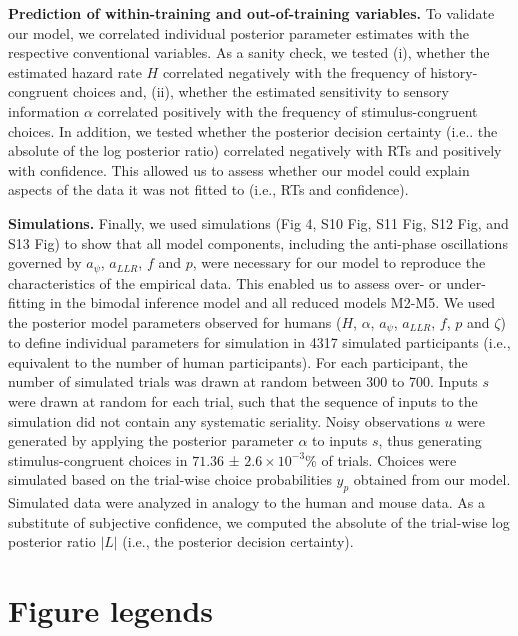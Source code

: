 \documentclass[
]{article}
\begin{document}
\textbf{Prediction of within-training and out-of-training variables.} To
validate our model, we correlated individual posterior parameter
estimates with the respective conventional variables. As a sanity check,
we tested (i), whether the estimated hazard rate \(H\) correlated
negatively with the frequency of history-congruent choices and, (ii),
whether the estimated sensitivity to sensory information \(\alpha\)
correlated positively with the frequency of stimulus-congruent choices.
In addition, we tested whether the posterior decision certainty (i.e..
the absolute of the log posterior ratio) correlated negatively with RTs
and positively with confidence. This allowed us to assess whether our
model could explain aspects of the data it was not fitted to (i.e., RTs
and confidence).

\textbf{Simulations.} Finally, we used simulations (Fig 4,
S10 Fig, S11 Fig, S12 Fig, and S13 Fig) to show that all model components,
including the anti-phase oscillations governed by \(a_{\psi}\),
\(a_{LLR}\), \(f\) and \(p\), were necessary for our model to reproduce
the characteristics of the empirical data. This enabled us to assess
over- or under-fitting in the bimodal inference model and all reduced
models M2-M5. We used the posterior model parameters observed for humans
(\(H\), \(\alpha\), \(a_{\psi}\), \(a_{LLR}\), \(f\), \(p\) and
\(\zeta\)) to define individual parameters for simulation in 4317
simulated participants (i.e., equivalent to the number of human
participants). For each participant, the number of simulated trials was
drawn at random between 300 to 700. Inputs \(s\) were drawn at random
for each trial, such that the sequence of inputs to the simulation did
not contain any systematic seriality. Noisy observations \(u\) were
generated by applying the posterior parameter \(\alpha\) to inputs
\(s\), thus generating stimulus-congruent choices in \(71.36\) ±
\(\ensuremath{2.6\times 10^{-3}}\)\% of trials. Choices were simulated
based on the trial-wise choice probabilities \(y_{p}\) obtained from our
model. Simulated data were analyzed in analogy to the human and mouse
data. As a substitute of subjective confidence, we computed the absolute
of the trial-wise log posterior ratio \(|L|\) (i.e., the posterior
decision certainty).

\newpage

\hypertarget{figures}{%
\section{Figure legends}\label{figures}}
\end{document}
